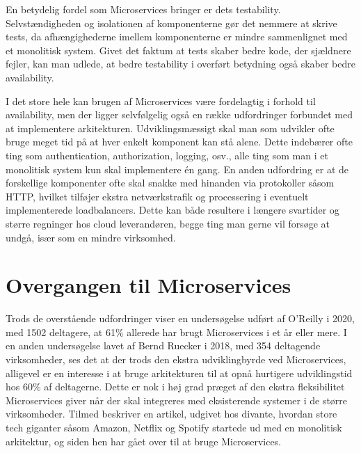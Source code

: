 \documentclass{article}
\begin{document}
\begin{flushleft}
En betydelig fordel som Microservices bringer er dets testability. Selvstændigheden og isolationen af komponenterne gør det nemmere at skrive tests, da afhængighederne imellem komponenterne er mindre sammenlignet med et monolitisk system.\cite{micro4} Givet det faktum at tests skaber bedre kode, der sjældnere fejler\cite{micro5}, kan man udlede, at bedre testability i overført betydning også skaber bedre availability.\linebreak

I det store hele kan brugen af Microservices være fordelagtig i forhold til availability, men der ligger selvfølgelig også en række udfordringer forbundet med at implementere arkitekturen. Udviklingsmæssigt skal man som udvikler ofte bruge meget tid på at hver enkelt komponent kan stå alene. Dette indebærer ofte ting som authentication, authorization, logging, osv., alle ting som man i et monolitisk system kun skal implementere én gang.\cite{micro6} En anden udfordring er at de forskellige komponenter ofte skal snakke med hinanden via protokoller såsom HTTP, hvilket tilføjer ekstra netværkstrafik og processering i eventuelt implementerede loadbalancers. Dette kan både resultere i længere svartider og større regninger hos cloud leverandøren, begge ting man gerne vil forsøge at undgå, især som en mindre virksomhed.\cite{micro7}

\section*{Overgangen til Microservices}
Trods de overstående udfordringer viser en undersøgelse udført af O'Reilly\cite{oreilly} i 2020, med 1502 deltagere\cite{research}, at 61\% allerede har brugt Microservices i et år eller mere. I en anden undersøgelse lavet af Bernd Ruecker i 2018, med 354 deltagende virksomheder\cite{research2}, ses det at der trods den ekstra udviklingbyrde ved Microservices, alligevel er en interesse i at bruge arkitekturen til at opnå hurtigere udviklingstid hos 60\% af deltagerne. Dette er nok i høj grad præget af den ekstra fleksibilitet Microservices giver når der skal integreres med eksisterende systemer i de større virksomheder. Tilmed beskriver en artikel\cite{mono3}, udgivet hos divante\cite{divante}, hvordan store tech giganter såsom Amazon, Netflix og Spotify startede ud med en monolitisk arkitektur, og siden hen har gået over til at bruge Microservices.


\end{flushleft}
\end{document}
